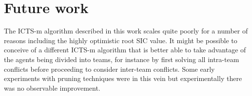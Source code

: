 \documentclass[english]{article}
\begin{document}
	\section{Future work}
	The ICTS-m algorithm described in this work scales quite poorly for a number of reasons including the highly optimistic root SIC value. It might be possible to conceive of a different ICTS-m algorithm that is better able to take advantage of the agents being divided into teams, for instance by first solving all intra-team conflicts before proceeding to consider inter-team conflicts. Some early experiments with pruning techniques were in this vein but experimentally there was no observable improvement.
	\printbibliography
	
\end{document}
